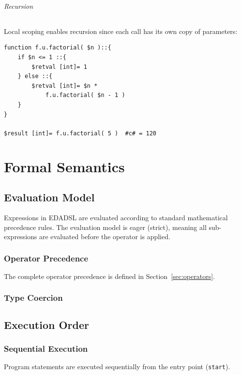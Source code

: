 \documentclass{report}
\begin{document}
\paragraph{Recursion}
Local scoping enables recursion since each call has its own copy of parameters:
\begin{verbatim}
function f.u.factorial( $n )::{
    if $n <= 1 ::{
        $retval [int]= 1
    } else ::{
        $retval [int]= $n * 
            f.u.factorial( $n - 1 )
    }
}

$result [int]= f.u.factorial( 5 )  #c# = 120
\end{verbatim}




\part{Formal Semantics}
\chapter{Evaluation Model} %
Expressions in EDADSL are evaluated according to standard mathematical precedence rules. The evaluation model is eager (strict), meaning all sub-expressions are evaluated before the operator is applied.

\section{Operator Precedence}
The complete operator precedence is defined in Section~\ref{sec:operators}.

\section{Type Coercion}


\chapter{Execution Order}  %

\section{Sequential Execution}
Program statements are executed sequentially from the entry point (\texttt{start}).
\end{document}
